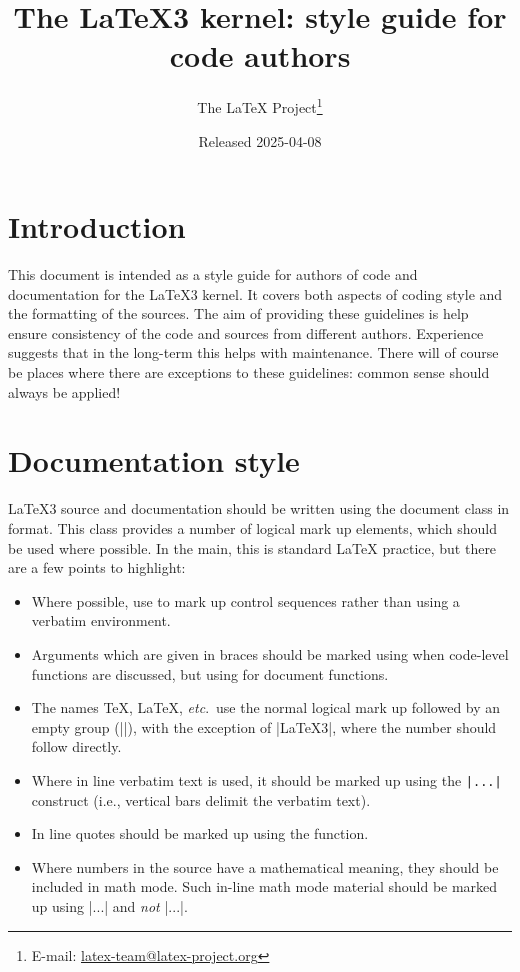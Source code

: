 \documentclass{l3doc}
\title{%
  The \LaTeX3 kernel: style guide for code authors%
}
\author{%
  The \LaTeX{} Project\thanks
    {%
      E-mail:
      \href{mailto:latex-team@latex-project.org}%
        {latex-team@latex-project.org}%
    }%
}
\date{Released 2025-04-08}
\begin{document}
\maketitle

\tableofcontents

\section{Introduction}

This document is intended as a style guide for authors of code and
documentation for the \LaTeX3 kernel. It covers both aspects of coding
style and the formatting of the sources. The aim of providing these
guidelines is help ensure consistency of the code and sources from
different authors. Experience suggests that in the long-term this helps
with maintenance. There will of course be places where there are
exceptions to these guidelines: common sense should always be
applied!

\section{Documentation style}

\LaTeX3 source and documentation should be written using the document
class  in  format. This class provides a number
of logical mark up elements, which should be used where possible.
In the main, this is standard \LaTeX{} practice, but there are a
few points to highlight:
\begin{itemize}
  \item
    Where possible, use  to mark up control sequences
    rather than using a verbatim environment.
  \item
    Arguments which are given in braces should be marked using
     when code-level functions are discussed, but using
     for document functions.
  \item
    The names \TeX{}, \LaTeX{}, \emph{etc}.\ use the normal logical mark
    up followed by an empty group (|{}|), with the exception of |\LaTeX3|,
    where the number should follow directly.
  \item
    Where in line verbatim text is used, it should be marked up
    using the \verb=|...|= construct (i.e., vertical bars delimit
    the verbatim text).
  \item In line quotes should be marked up using the 
    function.
  \item
    Where numbers in the source have a mathematical meaning,
    they should be included in math mode. Such in-line math mode
    material should be marked up using |$...$| and  \emph{not}
    |\(...\)|.
\end{itemize}
\end{document}
